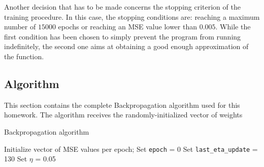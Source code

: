 \documentclass[12pt]{article}
\begin{document}
Another decision that has to be made concerns the stopping criterion of the training procedure.
In this case, the stopping conditions are: reaching a maximum number of $15000$ epochs or reaching an MSE value lower than $0.005$.
While the first condition has been chosen to simply prevent the program from running indefinitely, the second one aims at obtaining a good enough approximation of the function.

\subsection{Algorithm}

This section contains the complete Backpropagation algorithm used for this homework.
The algorithm receives the randomly-initialized vector of weights

\begin{algorithm}
  \caption{Backpropagation algorithm}
  \label{alg:bp}
  \begin{algorithmic}[1]
    \State Initialize vector of MSE values per epoch;
    \State Set \verb|epoch| = 0
    \State Set \verb|last_eta_update| = 130
    \State Set $\eta$ = 0.05
    
  \end{algorithmic}
\end{algorithm}
\end{document}

